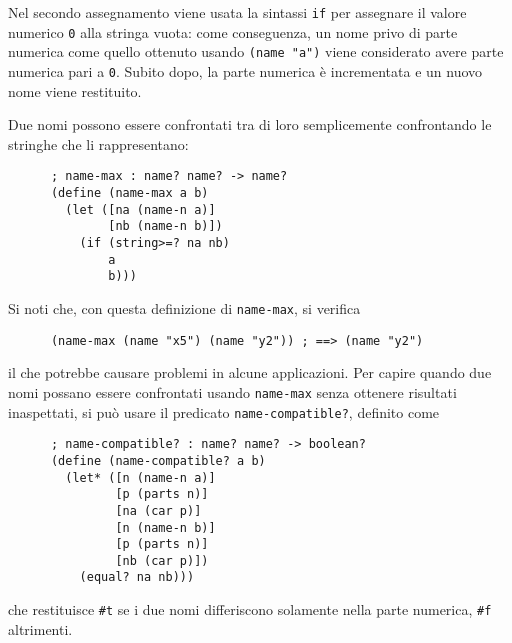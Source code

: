 Nel secondo assegnamento viene usata la sintassi \lstinline{if} per
assegnare il valore numerico \lstinline{0} alla stringa vuota: come
conseguenza, un nome privo di parte numerica come quello ottenuto usando
\lstinline{(name "a")} viene considerato avere parte numerica pari a
\lstinline{0}. Subito dopo, la parte numerica \`e incrementata e un nuovo
nome viene restituito.

Due nomi possono essere confrontati tra di loro semplicemente confrontando
le stringhe che li rappresentano:

\begin{lstlisting}
      ; name-max : name? name? -> name?
      (define (name-max a b)
        (let ([na (name-n a)]
              [nb (name-n b)])
          (if (string>=? na nb)
              a
              b)))
\end{lstlisting}

Si noti che, con questa definizione di \lstinline{name-max}, si verifica

\begin{lstlisting}
      (name-max (name "x5") (name "y2")) ; ==> (name "y2")
\end{lstlisting}

il che potrebbe causare problemi in alcune applicazioni. Per capire quando
due nomi possano essere confrontati usando \lstinline{name-max} senza
ottenere risultati inaspettati, si pu\`o usare il predicato
\lstinline{name-compatible?}, definito come

\begin{lstlisting}
      ; name-compatible? : name? name? -> boolean?
      (define (name-compatible? a b)
        (let* ([n (name-n a)]
               [p (parts n)]
               [na (car p)]
               [n (name-n b)]
               [p (parts n)]
               [nb (car p)])
          (equal? na nb)))
\end{lstlisting}

che restituisce \lstinline{#t} se i due nomi differiscono solamente nella
parte numerica, \lstinline{#f} altrimenti.
